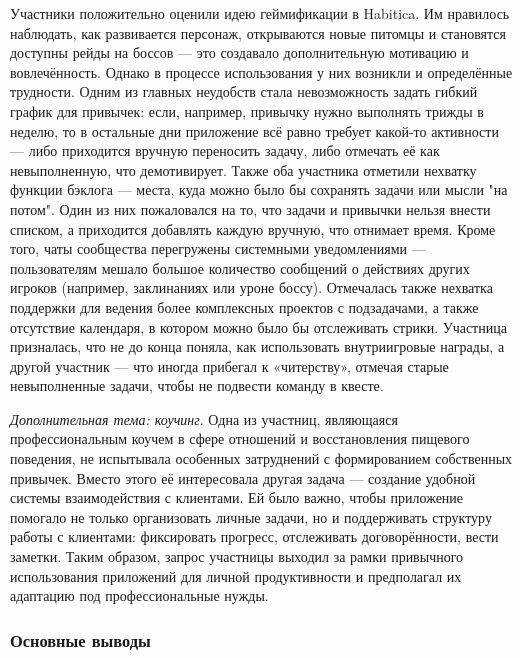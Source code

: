 \documentclass[pdflatex,sn-mathphys-num]{sn-jnl}%
\theoremstyle{thmstyleone}%
\theoremstyle{thmstyletwo}%
\theoremstyle{thmstylethree}%
\begin{document}
Участники положительно оценили идею геймификации в Habitica. Им нравилось наблюдать, как развивается персонаж, открываются новые питомцы и становятся доступны рейды на боссов — это создавало дополнительную мотивацию и вовлечённость. Однако в процессе использования у них возникли и определённые трудности. Одним из главных неудобств стала невозможность задать гибкий график для привычек: если, например, привычку нужно выполнять трижды в неделю, то в остальные дни приложение всё равно требует какой-то активности — либо приходится вручную переносить задачу, либо отмечать её как невыполненную, что демотивирует. Также оба участника отметили нехватку функции бэклога — места, куда можно было бы сохранять задачи или мысли "на потом". Один из них пожаловался на то, что задачи и привычки нельзя внести списком, а приходится добавлять каждую вручную, что отнимает время. Кроме того, чаты сообщества перегружены системными уведомлениями — пользователям мешало большое количество сообщений о действиях других игроков (например, заклинаниях или уроне боссу). Отмечалась также нехватка поддержки для ведения более комплексных проектов с подзадачами, а также отсутствие календаря, в котором можно было бы отслеживать стрики. Участница призналась, что не до конца поняла, как использовать внутриигровые награды, а другой участник — что иногда прибегал к «читерству», отмечая старые невыполненные задачи, чтобы не подвести команду в квесте.

\textit{Дополнительная тема: коучинг}.  Одна из участниц, являющаяся профессиональным коучем в сфере отношений и восстановления пищевого поведения, не испытывала особенных затруднений с формированием собственных привычек. Вместо этого её интересовала другая задача — создание удобной системы взаимодействия с клиентами. Ей было важно, чтобы приложение помогало не только организовать личные задачи, но и поддерживать структуру работы с клиентами: фиксировать прогресс, отслеживать договорённости, вести заметки. Таким образом, запрос участницы выходил за рамки привычного использования приложений для личной продуктивности и предполагал их адаптацию под профессиональные нужды.

\subsubsection{Основные выводы}
\end{document}
